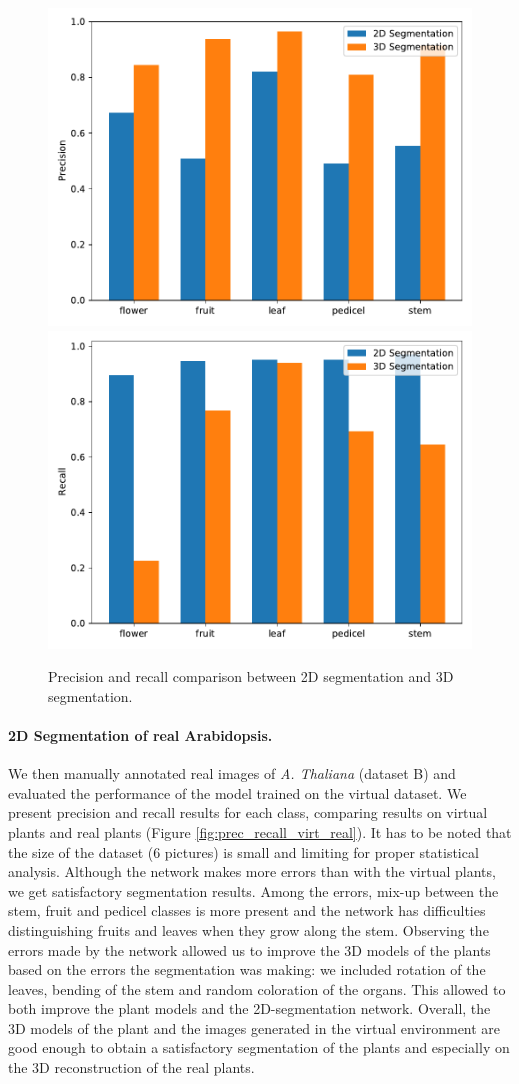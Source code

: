 \begin{figure}[h!]
    \centering \includegraphics[width = 0.5\linewidth]{figures/eval_precision.pdf}\includegraphics[width = 0.5\linewidth]{figures/eval_recall.pdf}
    \caption{Precision and recall comparison between 2D segmentation and 3D
segmentation.} \label{fig:prec_recall_2d_3d}
\end{figure}


\paragraph{2D Segmentation of real Arabidopsis.}
 We then manually annotated real images of \emph{A. Thaliana} (dataset B) and evaluated the performance of the model trained on the virtual dataset. We present precision and recall results for each class, comparing results on virtual plants and real plants (Figure \ref{fig:prec_recall_virt_real}). It has to be noted that the size of the dataset (6 pictures) is small and limiting for proper statistical analysis. Although the network makes more errors than with the virtual plants, we get satisfactory segmentation results. Among the errors, mix-up between the stem, fruit and pedicel classes is more present and the network has difficulties distinguishing fruits and leaves when they grow along the stem. Observing the errors made by the network allowed us to improve the 3D models of the plants based on the errors the segmentation was making: we included rotation of the leaves, bending of the stem and random coloration of the organs. This allowed to both improve the plant models and the 2D-segmentation network. Overall, the 3D models of the plant and the images generated in the virtual environment are good enough to obtain a satisfactory segmentation of the plants and especially on the 3D reconstruction of the real plants.\\



